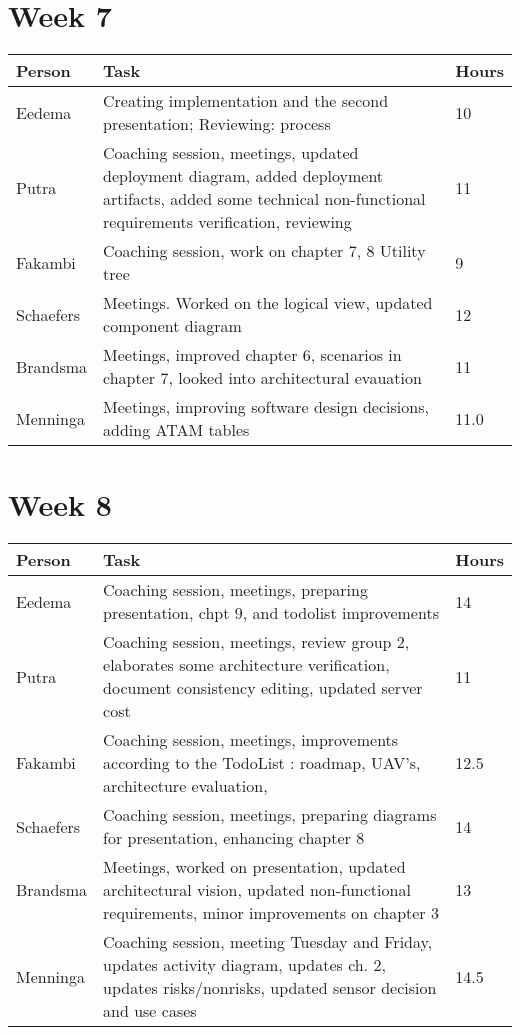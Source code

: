 \section{Week 7}
\begin{tabular}{p{} p{} p{}}
	\textbf{Person} & \textbf{Task}                                                                                                                  & \textbf{Hours} \\ \midrule
	Eedema          & Creating implementation and the second presentation; Reviewing: process& 10 \\ \midrule
	Putra           & Coaching session, meetings, updated deployment diagram, added deployment artifacts, added some technical non-functional requirements verification, reviewing & 11 \\ \midrule
	Fakambi         & Coaching session, work on chapter 7, 8 Utility tree & 9\\ \midrule
	Schaefers       & Meetings. Worked on the logical view, updated component diagram & 12 \\ \midrule
	Brandsma        & Meetings, improved chapter 6, scenarios in chapter 7, looked into architectural evauation & 11 \\ \midrule
	Menninga        & Meetings, improving software design decisions, adding ATAM tables                      &  11.0    \\
	\midrule
\end{tabular}

\section{Week 8}
\begin{tabular}{p{} p{} p{}}
	\textbf{Person} & \textbf{Task}                                                                                                                  & \textbf{Hours} \\ \midrule
	Eedema          & Coaching session, meetings, preparing presentation, chpt 9, and todolist improvements& 14  \\ \midrule
	Putra           & Coaching session, meetings, review group 2, elaborates some architecture verification, document consistency editing, updated server cost & 11 \\ \midrule
	Fakambi         & Coaching session, meetings, improvements according to the TodoList : roadmap, UAV's, architecture evaluation, & 12.5\\ \midrule
	Schaefers       & Coaching session, meetings, preparing diagrams for presentation, enhancing chapter 8 & 14\\ \midrule
	Brandsma        & Meetings, worked on presentation, updated architectural vision, updated non-functional requirements, minor improvements on chapter 3 & 13 \\ \midrule
	Menninga        & Coaching session, meeting Tuesday and Friday, updates activity diagram, updates ch. 2, updates risks/nonrisks, updated sensor decision and use cases & 14.5 \\
	\midrule
\end{tabular}